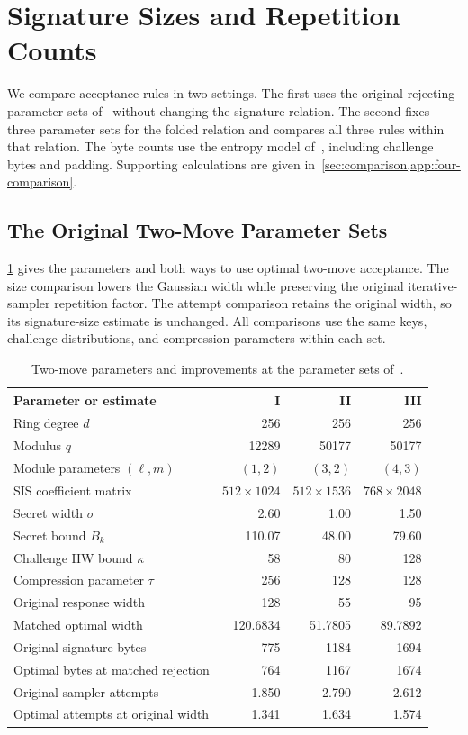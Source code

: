 \section{Signature Sizes and Repetition Counts}
\label{sec:results}

We compare acceptance rules in two settings. The first uses the original rejecting parameter sets of~\cite{GartnerFull} without changing the signature relation. The second fixes three parameter sets for the folded relation and compares all three rules within that relation. The byte counts use the entropy model of~\cite[Equation~(8) and Appendix~A.2]{GartnerFull}, including challenge bytes and padding. Supporting calculations are given in~\cref{sec:comparison,app:four-comparison}.

\subsection{The Original Two-Move Parameter Sets}

\cref{tab:summary-two} gives the parameters and both ways to use optimal two-move acceptance. The size comparison lowers the Gaussian width while preserving the original iterative-sampler repetition factor. The attempt comparison retains the original width, so its signature-size estimate is unchanged. All comparisons use the same keys, challenge distributions, and compression parameters within each set.

\begin{table}[!htbp]
\centering
\begin{tabular}{lrrr}
\toprule
Parameter or estimate & I & II & III\\
\midrule
Ring degree $d$ & 256 & 256 & 256\\
Modulus $q$ & 12289 & 50177 & 50177\\
Module parameters $(\ell,m)$ & $(1,2)$ & $(3,2)$ & $(4,3)$\\
SIS coefficient matrix & $512\times1024$ & $512\times1536$ & $768\times2048$\\
Secret width $\sigma$ & 2.60 & 1.00 & 1.50\\
Secret bound $B_k$ & 110.07 & 48.00 & 79.60\\
Challenge HW bound $\kappa$ & 58 & 80 & 128\\
Compression parameter $\tau$ & 256 & 128 & 128\\
Original response width & 128 & 55 & 95\\
Matched optimal width & 120.6834 & 51.7805 & 89.7892\\
\midrule
Original signature bytes & 775 & 1184 & 1694\\
Optimal bytes at matched rejection & 764 & 1167 & 1674\\
Original sampler attempts & 1.850 & 2.790 & 2.612\\
Optimal attempts at original width & 1.341 & 1.634 & 1.574\\
\bottomrule
\end{tabular}
\caption{Two-move parameters and improvements at the parameter sets of~\cite{GartnerFull}.}
\label{tab:summary-two}
\end{table}

